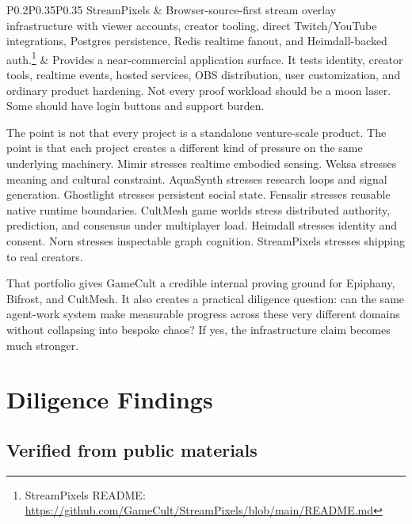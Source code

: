 \documentclass[11pt,oneside]{report}
\newcommand{\src}[2]{\footnote{#1: \url{#2}}}
\begin{document}
\begin{longtable}{P{0.2\linewidth}P{0.35\linewidth}P{0.35\linewidth}}
StreamPixels & Browser-source-first stream overlay infrastructure with viewer accounts, creator tooling, direct Twitch/YouTube integrations, Postgres persistence, Redis realtime fanout, and Heimdall-backed auth.\src{StreamPixels README}{https://github.com/GameCult/StreamPixels/blob/main/README.md} & Provides a near-commercial application surface. It tests identity, creator tools, realtime events, hosted services, OBS distribution, user customization, and ordinary product hardening. Not every proof workload should be a moon laser. Some should have login buttons and support burden. \\
\bottomrule
\end{longtable}

The point is not that every project is a standalone venture-scale product. The point is that each project creates a different kind of pressure on the same underlying machinery. Mimir stresses realtime embodied sensing. Weksa stresses meaning and cultural constraint. AquaSynth stresses research loops and signal generation. Ghostlight stresses persistent social state. Fensalir stresses reusable native runtime boundaries. CultMesh game worlds stress distributed authority, prediction, and consensus under multiplayer load. Heimdall stresses identity and consent. Norn stresses inspectable graph cognition. StreamPixels stresses shipping to real creators.

That portfolio gives GameCult a credible internal proving ground for Epiphany, Bifrost, and CultMesh. It also creates a practical diligence question: can the same agent-work system make measurable progress across these very different domains without collapsing into bespoke chaos? If yes, the infrastructure claim becomes much stronger.

\chapter{Diligence Findings}

\section{Verified from public materials}
\end{document}

